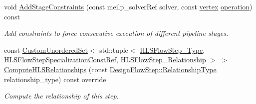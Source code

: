 \begin{DoxyCompactItemize}
void \hyperlink{classSDCScheduling_a39750be65287d266d7cf259d91667246}{Add\+Stage\+Constraints} (const meilp\+\_\+solver\+Ref solver, const \hyperlink{graph_8hpp_abefdcf0544e601805af44eca032cca14}{vertex} \hyperlink{structoperation}{operation}) const
\begin{DoxyCompactList}\small\item\em Add constraints to force consecutive execution of different pipeline stages. \end{DoxyCompactList}\item 
const \hyperlink{classCustomUnorderedSet}{Custom\+Unordered\+Set}$<$ std\+::tuple$<$ \hyperlink{hls__step_8hpp_ada16bc22905016180e26fc7e39537f8d}{H\+L\+S\+Flow\+Step\+\_\+\+Type}, \hyperlink{hls__step_8hpp_a5fdd2edf290c196531d21d68e13f0e74}{H\+L\+S\+Flow\+Step\+Specialization\+Const\+Ref}, \hyperlink{hls__step_8hpp_a3ad360b9b11e6bf0683d5562a0ceb169}{H\+L\+S\+Flow\+Step\+\_\+\+Relationship} $>$ $>$ \hyperlink{classSDCScheduling_aec06b6a8117baa3496c1ee294c4341ab}{Compute\+H\+L\+S\+Relationships} (const \hyperlink{classDesignFlowStep_a723a3baf19ff2ceb77bc13e099d0b1b7}{Design\+Flow\+Step\+::\+Relationship\+Type} relationship\+\_\+type) const override
\begin{DoxyCompactList}\small\item\em Compute the relationship of this step. \end{DoxyCompactList}\end{DoxyCompactItemize}
